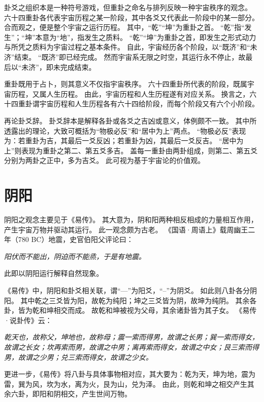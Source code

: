 \documentclass[11pt]{article}
\begin{document}
卦爻之组织本是一种符号游戏，但重卦之命名与排列反映一种宇宙秩序的观念。
六十四重卦各代表宇宙历程之某一阶段，其中各爻又代表此一阶段中的某一部分。
合而观之，便是整个宇宙之运行历程。
其中，“乾”“坤”为重卦之首。
“乾”指“发生”；“坤”本意为“地”，指发生之质料。
“乾”“坤”为重卦之首，即发生之形式动力与所凭之质料为宇宙过程之基本条件。
自此，宇宙经历各个阶段，以“既济”和“未济”结束。
“既济”即已经完成。
然而宇宙系无限之时空，其运行永不停止，故最后以“未济”，即未完成结束。

\par

重卦既用于占卜，则其意义不仅指宇宙秩序。
六十四重卦所代表的阶段，既属宇宙历程，又属人生历程。
由此，宇宙历程和人生历程遂有对应关系。
换言之，六十四重卦谓宇宙历程和人生历程各有六十四给阶段，而每个阶段又有六个小阶段。

\par

再论卦爻辞。
卦爻辞本是解释各卦或各爻之吉凶或意义，体例颇不一致。
其中所透露出的理论，大致可概括为“物极必反”和“居中为上”两点。
“物极必反”表现为：若重卦为吉，其最后一爻反凶；若重卦为凶，其最后一爻反吉。
“居中为上”则表现为重卦之第二、第五爻多吉。
盖每一重卦由两卦组成，则第二、第五爻分别为两卦之正中，多为吉爻。
此可视为基于宇宙论的价值观。
  
\section{阴阳}
阴阳之观念主要见于《易传》。
其大意为，阴和阳两种相反相成的力量相互作用，产生宇宙万物并驱动其运行。
此一观念颇为古老。
《国语·周语上》载周幽王二年（780 BC）地震，史官伯阳父评论曰：

\textit{阳伏而不能出，阴迫而不能烝，于是有地震。}

此即以阴阳运行解释自然现象。

\par

《易传》中，阴阳和卦爻相关联，谓“—”为阳爻，“--”为阴爻。
如此则八卦各分阴阳。
其中乾之三爻皆为阳，故乾为纯阳；坤之三爻皆为阴，故坤为纯阴。
其余各卦，皆为乾和坤相交而成。
故乾和坤被视为父母，其余诸卦皆为其子女。
《易传·说卦传》云：

\textit{乾天也，故称父，坤地也，故称母；震一索而得男，故谓之长男；巽一索而得女，故谓之长女；坎再索而男，故谓之中男；离再索而得女，故谓之中女；艮三索而得男，故谓之少男；兑三索而得女，故谓之少女。}

更进一步，《易传》将八卦与具体事物相对应，其大要为：乾为天，坤为地，震为雷，巽为风，坎为水，离为火，艮为山，兑为泽。
由此，则乾和坤之相交产生其余六卦，即阳和阴相交，产生世间万物。
  
\end{document}

